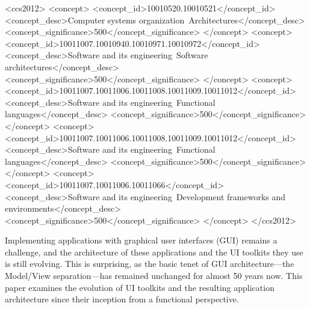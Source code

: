 \documentclass[sigplan,review,screen]{acmart}
\begin{document}
\begin{CCSXML}
<ccs2012>
   <concept>
       <concept_id>10010520.10010521</concept_id>
       <concept_desc>Computer systems organization~Architectures</concept_desc>
       <concept_significance>500</concept_significance>
       </concept>
   <concept>
       <concept_id>10011007.10010940.10010971.10010972</concept_id>
       <concept_desc>Software and its engineering~Software architectures</concept_desc>
       <concept_significance>500</concept_significance>
       </concept>
   <concept>
       <concept_id>10011007.10011006.10011008.10011009.10011012</concept_id>
       <concept_desc>Software and its engineering~Functional languages</concept_desc>
       <concept_significance>500</concept_significance>
       </concept>
   <concept>
       <concept_id>10011007.10011006.10011008.10011009.10011012</concept_id>
       <concept_desc>Software and its engineering~Functional languages</concept_desc>
       <concept_significance>500</concept_significance>
       </concept>
    <concept>
        <concept_id>10011007.10011006.10011066</concept_id>
        <concept_desc>Software and its engineering~Development frameworks and environments</concept_desc>
        <concept_significance>500</concept_significance>
    </concept>
</ccs2012>
\end{CCSXML}



\maketitle

Implementing applications with graphical user interfaces (GUI) remains
a challenge, and the architecture of these applications and the UI
toolkits they use is still evolving.  This is surprising, as the basic
tenet of GUI architecture---the Model/View separation---has remained
unchanged for almost 50 years now.
This paper examines the evolution of UI toolkits and the resulting
application architecture since their inception from a functional
perspective.
\end{document}
